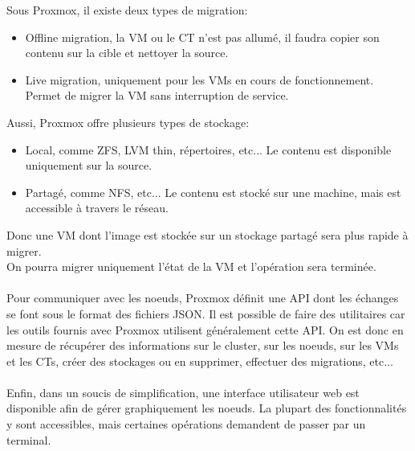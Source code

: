\documentclass[14pt]{extarticle}
\begin{document}
    \noindent
    Sous Proxmox, il existe deux types de migration:
    \begin{itemize}[nosep,label=\textendash]
        \item Offline migration, la VM ou le CT n'est pas allumé, il faudra copier son contenu sur la cible et nettoyer la source.
        \item Live migration, uniquement pour les VMs en cours de fonctionnement. Permet de migrer la VM sans interruption de service.
    \end{itemize}
    Aussi, Proxmox offre plusieurs types de stockage:
    \begin{itemize}[nosep,label=\textendash]
        \item Local, comme ZFS, LVM thin, répertoires, etc... Le contenu est disponible uniquement sur la source.
        \item Partagé, comme NFS, etc... Le contenu est stocké sur une machine, mais est accessible à travers le réseau. 
    \end{itemize}
    Donc une VM dont l'image est stockée sur un stockage partagé sera plus rapide à migrer.\\
    On pourra migrer uniquement l'état de la VM et l'opération sera terminée.\\
    \\
    Pour communiquer avec les noeuds, Proxmox définit une API \cite{api} dont les échanges se font sous le format des fichiers JSON. Il est possible de faire des utilitaires car les outils fournis avec Proxmox utilisent généralement cette API. On est donc en mesure de récupérer des informations sur le cluster, sur les noeuds, sur les VMs et les CTs, créer des stockages ou en supprimer, effectuer des migrations, etc...\\
    \\
    Enfin, dans un soucis de simplification, une interface utilisateur web est disponible afin de gérer graphiquement les noeuds. La plupart des fonctionnalités y sont accessibles, mais certaines opérations demandent de passer par un terminal.
    \newpage
\end{document}

